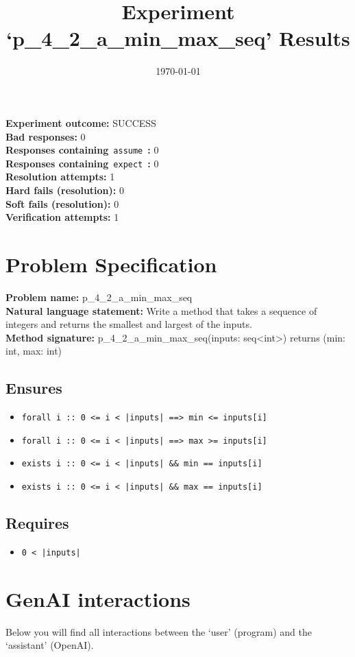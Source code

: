 \documentclass{article}
\begin{document}
\title{Experiment `p\_4\_2\_a\_min\_max\_seq' Results}
\author{\today}
\date{}
\maketitle
\textbf{Experiment outcome: }SUCCESS
\\\textbf{Bad responses: }0
\\\textbf{Responses containing}~\texttt{assume}~\textbf{: }0
\\\textbf{Responses containing}~\texttt{expect}~\textbf{: }0
\\\textbf{Resolution attempts: }1
\\\textbf{Hard fails (resolution): }0
\\\textbf{Soft fails (resolution): }0
\\\textbf{Verification attempts: }1
\section*{Problem Specification}
\textbf{Problem name: }p\_4\_2\_a\_min\_max\_seq
\\\textbf{Natural language statement: }Write a method that takes a sequence of integers and returns the smallest and largest of the inputs.
\\\textbf{Method signature: }p\_4\_2\_a\_min\_max\_seq(inputs: seq<int>) returns (min: int, max: int)
\subsection*{Ensures}
\begin{itemize}
\item \texttt{forall i :: 0 <= i < |inputs| ==> min <= inputs[i]}
\item \texttt{forall i :: 0 <= i < |inputs| ==> max >= inputs[i]}
\item \texttt{exists i :: 0 <= i < |inputs| \&\& min == inputs[i]}
\item \texttt{exists i :: 0 <= i < |inputs| \&\& max == inputs[i]}
\end{itemize}
\subsection*{Requires}
\begin{itemize}
\item \texttt{0 < |inputs|}
\end{itemize}
\clearpage
\section*{GenAI interactions}
Below you will find all interactions between the `user' (program) and the `assistant' (OpenAI).
\end{document}
